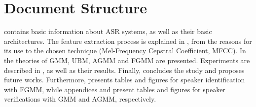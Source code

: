 \section{Document Structure}

 contains basic information about ASR systems, as well as their basic architectures. The feature extraction process is explained in , from the reasons for its use to the chosen technique (Mel-Frequency Cepstral Coefficient, MFCC). In  the theories of GMM, UBM, AGMM and FGMM are presented. Experiments are described in , as well as their results. Finally,  concludes the study and proposes future works. Furthermore,  presents tables and figures for speaker identification with FGMM, while appendices  and  present tables and figures for speaker verifications with GMM and AGMM, respectively.